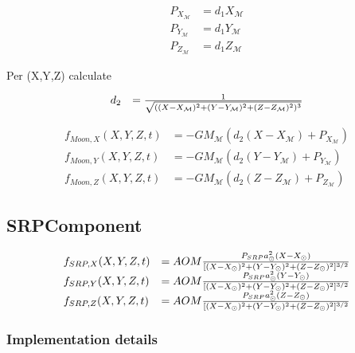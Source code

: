 \documentclass{article}
\begin{document}
\begin{equation}
\begin{array}{ll}
P_{X_{\mathcal M}} &= d_1X_{\mathcal M} \\
P_{Y_{\mathcal M}} &= d_1Y_{\mathcal M} \\
P_{Z_{\mathcal M}} &= d_1Z_{\mathcal M}
\end{array}
\end{equation}

Per (X,Y,Z) calculate

\begin{equation}
\begin{array}{ll}
d_2 &= {1 \over \sqrt{((X-X_\mathcal M)^2+(Y-Y_\mathcal M)^2+(Z-Z_\mathcal M)^2)^3}}
\end{array}
\end{equation}

\begin{equation}
\begin{array}{ll}
f_{Moon,X}(X,Y,Z,t) &=-GM_\mathcal M(d_2(X-X_{\mathcal M})+P_{X_{\mathcal M}}) \\
f_{Moon,Y}(X,Y,Z,t) &=-GM_\mathcal M(d_2(Y-Y_{\mathcal M})+P_{Y_{\mathcal M}}) \\
f_{Moon,Z}(X,Y,Z,t) &=-GM_\mathcal M(d_2(Z-Z_{\mathcal M})+P_{Z_{\mathcal M}})
\end{array}
\end{equation}

\subsection{SRPComponent}

\begin{equation}
\begin{array}{ll}
f_{SRP,X}(X,Y,Z,t) &= AOM
{P_{SRP}a_\odot^2(X-X_\odot)\over [(X-X_\odot)^2+(Y-Y_\odot)^2+(Z-Z_\odot)^2]^{3/2}}\\
f_{SRP,Y}(X,Y,Z,t) &= AOM
{P_{SRP}a_\odot^2(Y-Y_\odot)\over [(X-X_\odot)^2+(Y-Y_\odot)^2+(Z-Z_\odot)^2]^{3/2}}\\
f_{SRP,Z}(X,Y,Z,t) &= AOM
{P_{SRP}a_\odot^2(Z-Z_\odot)\over [(X-X_\odot)^2+(Y-Y_\odot)^2+(Z-Z_\odot)^2]^{3/2}}
\end{array}
\end{equation}

\subsubsection{Implementation details}
\end{document}
